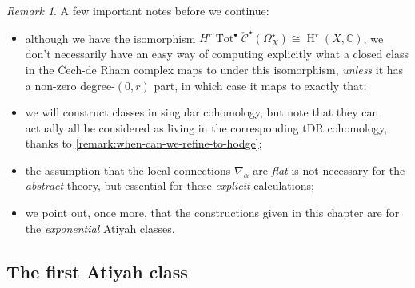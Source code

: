 \documentclass[11pt,fleqn]{article}
\theoremstyle{plain}
\theoremstyle{definition}
\theoremstyle{remark}
\newtheorem{remark}[theorem]{Remark}
\numberwithin{equation}{theorem}
\newcommand{\anotherbullet}{\star}
\newcommand{\cech}{\check{\mathscr{C}}}
\DeclareMathOperator{\Tot}{Tot}
\DeclareMathOperator{\HH}{H}
\begin{document}
        \begin{remark}
            A few important notes before we continue:
            \begin{itemize}
                \item although we have the isomorphism $H^r\Tot^\bullet\cech^\anotherbullet(\Omega^\anotherbullet_X) \cong \HH^r(X,\mathbb{C})$, we don't necessarily have an easy way of computing explicitly what a closed class in the Čech-de Rham complex maps to under this isomorphism, \emph{unless} it has a non-zero degree-$(0,r)$ part, in which case it maps to exactly that;
                \item we will construct classes in singular cohomology, but note that they can actually all be considered as living in the corresponding tDR cohomology, thanks to \cref{remark:when-can-we-refine-to-hodge};
                \item the assumption that the local connections $\nabla_\alpha$ are \emph{flat} is not necessary for the \emph{abstract} theory, but essential for these \emph{explicit} calculations;
                \item we point out, once more, that the constructions given in this chapter are for the \emph{exponential} Atiyah classes.
            \end{itemize}
        \end{remark}


    \subsection{The first Atiyah class}\label{subsection:first-manual-atiyah-class}
\end{document}
